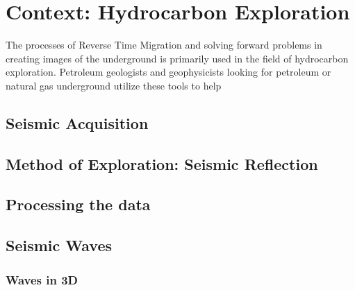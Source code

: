\newpage
\section{Context: Hydrocarbon Exploration}

The processes of Reverse Time Migration and solving forward problems in creating images of the underground is primarily used in the field of hydrocarbon exploration. Petroleum geologists and geophysicists looking for petroleum or natural gas underground utilize these tools to help 

\subsection{Seismic Acquisition}

\subsection{Method of Exploration: Seismic Reflection}

\subsection{Processing the data}

\subsection{Seismic Waves}
\subsubsection{Waves in 3D}